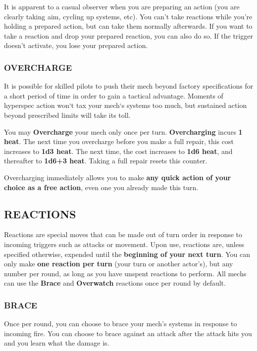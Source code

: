 It is apparent to a casual observer when you are preparing an action (you are clearly taking aim, cycling up systems, etc). You can’t take reactions while you’re holding a prepared action, but can take them normally afterwards. If you want to take a reaction and drop your prepared reaction, you can also do so. If the trigger doesn’t activate, you lose your prepared action.


\subsubsection{OVERCHARGE}
It is possible for skilled pilots to push their mech beyond factory specifications for a short period of time in order to gain a tactical advantage. Moments of hyperspec action won‘t tax your mech‘s systems too much, but sustained action beyond prescribed limits will take its toll. 

You may \textbf{Overcharge} your mech only once per turn. \textbf{Overcharging} incurs \textbf{1 heat}. The next time you overcharge before you make a full repair, this cost increases to \textbf{1d3 heat}. The next time, the cost increases to \textbf{1d6 heat}, and thereafter to \textbf{1d6+3 heat}. Taking a full repair resets this counter.

Overcharging immediately allows you to make \textbf{any quick action of your choice as a free action}, even one you already made this turn.


\subsection{REACTIONS}
Reactions are special moves that can be made out of turn order in response to incoming triggers such as attacks or movement. Upon use, reactions are, unless specified otherwise, expended until the \textbf{beginning of your next turn}. You can only make \textbf{one reaction per turn} (your turn or another actor’s), but any number per round, as long as you have unspent reactions to perform. All mechs can use the \textbf{Brace} and \textbf{Overwatch} reactions once per round by default.

\subsubsection{BRACE}
Once per round, you can choose to brace your mech’s systems in response to incoming fire. You can choose to brace against an attack after the attack hits you and you learn what the damage is.

